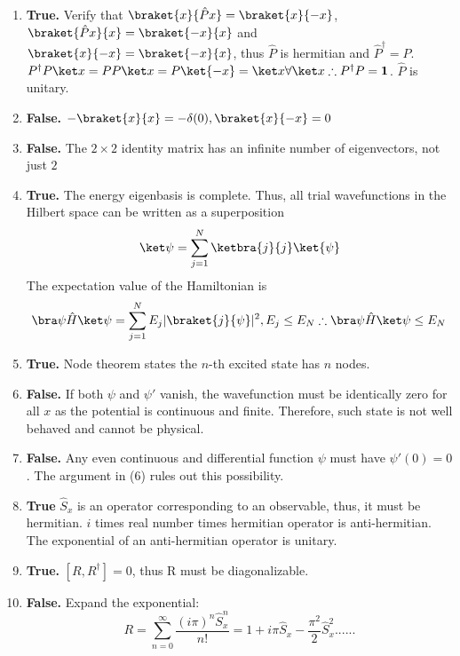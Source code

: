 \begin{sol}
\begin{enumerate}
    \item
    \textbf{True.} Verify that $\braket{ x}{ \hat Px}=\braket{x}{-x}$, $\braket{\hat Px}{x}=\braket{-x}{x}$ and $\braket{x}{-x}=\braket{-x}{x}$, thus $\hat P$ is hermitian and $\hat P^\dagger=\hat P$. $P^\dagger P\ket x=PP\ket x=P\ket {-x}=\ket x\forall\ket x\therefore P^\dagger P=\mathbf 1$. $\hat P$ is unitary.
    \item
    \textbf{False.} $-\braket{x}{x}=-\delta(0),\braket{x}{-x}=0$
    \item
    \textbf{False.} The $2\times 2$ identity matrix has an infinite number of eigenvectors, not just $2$
    \item
    \textbf{True.} The energy eigenbasis is complete. Thus, all trial wavefunctions in the Hilbert space can be written as a superposition
    $$\ket\psi=\sum_{j=1}^N\ketbra{j}{j}\ket{\psi}$$
    The expectation value of the Hamiltonian is 
    $$\bra\psi\hat H\ket\psi=\sum_{j=1}^NE_j|\braket{j}{\psi}|^2, E_j\leq E_N\therefore \bra\psi\hat H\ket\psi\leq E_N$$
    \item
    \textbf{True.} Node theorem states the $n$-th excited state has $n$ nodes.
    \item
    \textbf{False.} If both $\psi$ and $\psi'$ vanish, the wavefunction must be identically zero for all $x$ as the potential is continuous and finite. Therefore, such state is not well behaved and cannot be physical.
    \item
    \textbf{False.} Any even continuous and differential function $\psi$ must have $\psi'(0)=0$. The argument in (6) rules out this possibility.
    \item
    \textbf{True} $\hat S_x$ is an operator corresponding to an observable, thus, it must be hermitian. $i$ times real number times hermitian operator is anti-hermitian. The exponential of an anti-hermitian operator is unitary.
    \item
    \textbf{True.} $[R,R^\dagger]=0$, thus R must be diagonalizable.
    \item
    \textbf{False.} Expand the exponential:
    $$R=\sum_{n=0}^\infty\frac{(i\pi)^n\hat S_x^n}{n!}=1+i\pi\hat S_x-\frac{\pi^2}{2}\hat S_x^2......$$
\end{enumerate}
\end{sol}